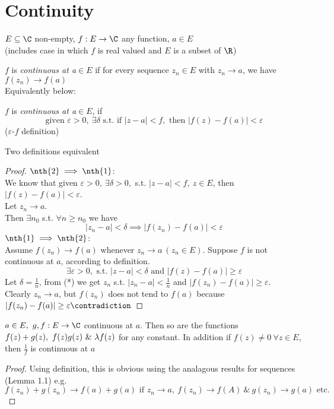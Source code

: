 \section{Continuity}
\begin{normal}
$E\subseteq \C$ non-empty, $f:E\to \C$ any function, $a\in E$\\
(includes case in which $f$ is real valued and $E$ is a subset of $\R$)
\end{normal}
\begin{definition}
$f$ is \emph{continuous at a}$\in E$ if for every sequence $z_n\in E$ with $z_n\to a$, we have $f(z_n) \to f(a)$\\
Equivalently below:
\end{definition}

\begin{definition}
$f$ is \emph{continuous at a}$\in E$, if
\[\text{given }\varepsilon > 0, \ \exists \delta \text{ s.t. if }|z-a| < f,\text{ then } |f(z)-f(a)|<\varepsilon\]
($\varepsilon$-$f$ definition)
\end{definition}
\begin{claim}
Two definitions equivalent
\begin{proof}
$\nth{2}\implies\nth{1}$:\\
We know that given $\varepsilon > 0, \ \exists \delta > 0,$ s.t. $|z-a| < f, \ z\in E$, then $|f(z) - f(a)| < \varepsilon$.\\
Let $z_n \to a$.\\
Then $\exists n_0$ s.t. $\forall n \geq n_0$ we have
\[|z_n - a| < \delta \implies |f(z_n) - f(a)| < \varepsilon\]
$\nth{1} \implies \nth{2}$:\\
Assume $f(z_n)\to f(a)$ whenever $z_n \to a \ (z_n\in E)$. Suppose $f$ is not continuous at $a$, according to  definition.
\[\exists \varepsilon > 0,\text{ s.t. }|z-a|<\delta \text{ and } |f(z) - f(a)|\geq \varepsilon\tag{*}\]
Let $\delta = \frac{1}{n}$, from (*) we get $z_n$ s.t. $|z_n - a|<\frac{1}{n}$ and $|f(z_n) - f(a)|\geq \varepsilon$.\\
Clearly $z_n\to a$, but $f(z_n)$ does not tend to $f(a)$ because $|f(z_n) - f(a)|\geq \varepsilon \contradiction$
 \end{proof}
\end{claim}
\begin{prop}
$a\in E, \ g,f:E\to \C$ continuous at $a$. Then so are the functions $f(z) + g(z), \ f(z)g(z) \ \& \ \la f(z)$ for any constant. In addition if $f(z)\neq 0 \ \forall z \in E$, then $\frac{1}{f}$ is continuous at $a$
\begin{proof}
Using  definition, this is obvious using the analagous results for sequences (Lemma 1.1) e.g.
\[f(z_n) + g(z_n) \to f(a) + g(a) \text{ if }z_n\to a, \ f(z_n)\to f(A) \ \& \ g(z_n) \to g(a) \text{ etc. }\]
\end{proof}
\end{prop}
